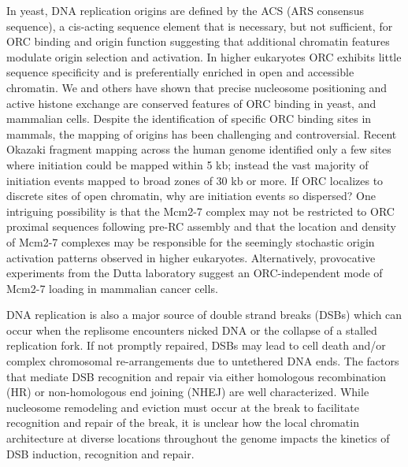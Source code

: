 In yeast, DNA replication origins are defined by the ACS (ARS consensus sequence), a cis-acting sequence element that is necessary, but not sufficient, for ORC binding and origin function\citep{Breier2004-tw} suggesting that additional chromatin features modulate origin selection and activation.  In higher eukaryotes ORC exhibits little sequence specificity\citep{Vashee2003-xr} and is preferentially enriched in open and accessible chromatin\citep{MacAlpine2010-ju,Miotto2016-jt}.   We and others have shown that precise nucleosome positioning and active histone exchange are conserved features of ORC binding in yeast\citep{Eaton2010-fq,Berbenetz2010-hh}, \dros\citep{Liu2015-nr,MacAlpine2010-wz} and mammalian cells\citep{Lombrana2013-aw,Lubelsky2011-dj}.  Despite the identification of specific ORC binding sites in mammals\citep{Miotto2016-jt}, the mapping of origins has been challenging and controversial\citep{Prioleau2016-bj}.  Recent Okazaki fragment mapping across the human genome identified only a few sites where initiation could be mapped within 5 kb; instead the vast majority of initiation events mapped to broad zones of 30 kb or more\citep{Petryk2016-rr}.  If ORC localizes to discrete sites of open chromatin\citep{MacAlpine2010-ju,Miotto2016-jt}, why are initiation events so dispersed?  One intriguing possibility is that the Mcm2-7 complex may not be restricted to ORC proximal sequences following pre-RC assembly and that the location and density of Mcm2-7 complexes may be responsible for the seemingly stochastic origin activation patterns observed in higher eukaryotes. Alternatively, provocative experiments from the Dutta laboratory suggest an ORC-independent mode of Mcm2-7 loading in mammalian cancer cells\citep{Shibata2016-uc}. 

DNA replication is also a major source of double strand breaks (DSBs) which can occur when the replisome encounters nicked DNA or the collapse of a stalled replication fork\citep{Munoz2017-mi}. If not promptly repaired, DSBs may lead to cell death and/or complex chromosomal re-arrangements due to untethered DNA ends\citep{Morgan1998-ii}. The factors that mediate DSB recognition and repair via either homologous recombination (HR) or non-homologous end joining (NHEJ) are well characterized\citep{Symington2011-la}. While nucleosome remodeling and eviction must occur at the break to facilitate recognition and repair of the break, %
it is unclear how the local chromatin architecture at diverse locations throughout the genome impacts the kinetics of DSB induction, recognition and repair.

